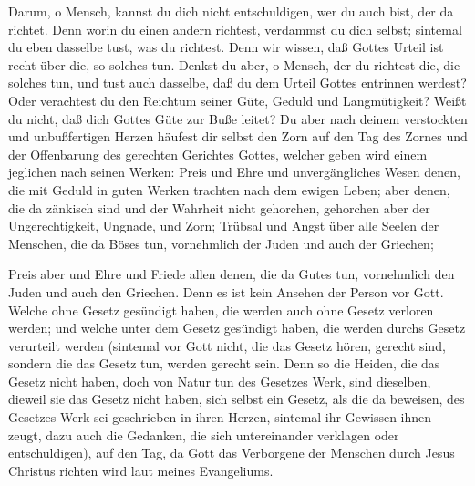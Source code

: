  Darum, o Mensch, kannst du dich nicht entschuldigen, wer du
auch bist, der da richtet. Denn worin du einen andern richtest,
verdammst du dich selbst; sintemal du eben dasselbe tust, was du
richtest.  Denn wir wissen, daß Gottes Urteil ist recht über
die, so solches tun.  Denkst du aber, o Mensch, der du
richtest die, die solches tun, und tust auch dasselbe, daß du dem Urteil
Gottes entrinnen werdest?  Oder verachtest du den Reichtum
seiner Güte, Geduld und Langmütigkeit? Weißt du nicht, daß dich Gottes
Güte zur Buße leitet?  Du aber nach deinem verstockten und
unbußfertigen Herzen häufest dir selbst den Zorn auf den Tag des Zornes
und der Offenbarung des gerechten Gerichtes Gottes,  welcher
geben wird einem jeglichen nach seinen Werken:  Preis und
Ehre und unvergängliches Wesen denen, die mit Geduld in guten Werken
trachten nach dem ewigen Leben;  aber denen, die da zänkisch
sind und der Wahrheit nicht gehorchen, gehorchen aber der
Ungerechtigkeit, Ungnade, und Zorn;  Trübsal und Angst über
alle Seelen der Menschen, die da Böses tun, vornehmlich der Juden und
auch der Griechen;

 Preis aber und Ehre und Friede allen denen, die da Gutes
tun, vornehmlich den Juden und auch den Griechen.  Denn es
ist kein Ansehen der Person vor Gott.  Welche ohne Gesetz
gesündigt haben, die werden auch ohne Gesetz verloren werden; und welche
unter dem Gesetz gesündigt haben, die werden durchs Gesetz verurteilt
werden  (sintemal vor Gott nicht, die das Gesetz hören,
gerecht sind, sondern die das Gesetz tun, werden gerecht sein.
 Denn so die Heiden, die das Gesetz nicht haben, doch von
Natur tun des Gesetzes Werk, sind dieselben, dieweil sie das Gesetz
nicht haben, sich selbst ein Gesetz,  als die da beweisen,
des Gesetzes Werk sei geschrieben in ihren Herzen, sintemal ihr Gewissen
ihnen zeugt, dazu auch die Gedanken, die sich untereinander verklagen
oder entschuldigen),  auf den Tag, da Gott das Verborgene
der Menschen durch Jesus Christus richten wird laut meines Evangeliums.

